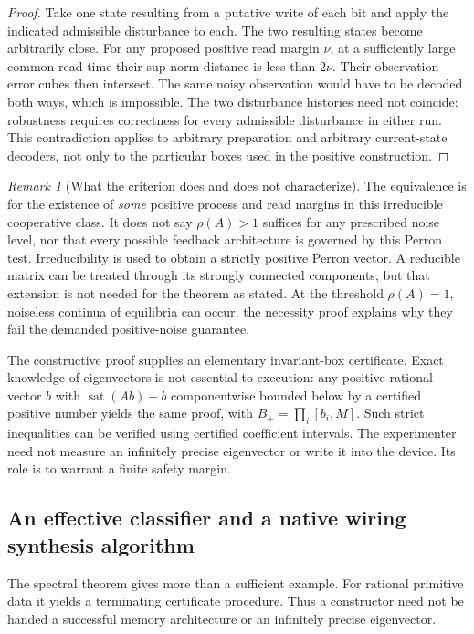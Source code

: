 \documentclass[11pt]{article}
\theoremstyle{definition}
\theoremstyle{remark}
\newtheorem{remark}[theorem]{Remark}
\newcommand{\sat}{\operatorname{sat}}
\begin{document}
\begin{proof}
Take one state resulting from a putative write of each bit and apply the indicated admissible disturbance to each. The two resulting states become arbitrarily close. For any proposed positive read margin $\nu$, at a sufficiently large common read time their sup-norm distance is less than $2\nu$. Their observation-error cubes then intersect. The same noisy observation would have to be decoded both ways, which is impossible. The two disturbance histories need not coincide: robustness requires correctness for every admissible disturbance in either run. This contradiction applies to arbitrary preparation and arbitrary current-state decoders, not only to the particular boxes used in the positive construction.
\end{proof}

\begin{remark}[What the criterion does and does not characterize]
The equivalence is for the existence of \emph{some} positive process and read margins in this irreducible cooperative class. It does not say $\rho(A)>1$ suffices for any prescribed noise level, nor that every possible feedback architecture is governed by this Perron test. Irreducibility is used to obtain a strictly positive Perron vector. A reducible matrix can be treated through its strongly connected components, but that extension is not needed for the theorem as stated. At the threshold $\rho(A)=1$, noiseless continua of equilibria can occur; the necessity proof explains why they fail the demanded positive-noise guarantee.
\end{remark}

The constructive proof supplies an elementary invariant-box certificate. Exact knowledge of eigenvectors is not essential to execution: any positive rational vector $b$ with $\sat(Ab)-b$ componentwise bounded below by a certified positive number yields the same proof, with $B_+=\prod_i[b_i,M]$. Such strict inequalities can be verified using certified coefficient intervals. The experimenter need not measure an infinitely precise eigenvector or write it into the device. Its role is to warrant a finite safety margin.

\subsection{An effective classifier and a native wiring synthesis algorithm}
\label{sec:wiring-synthesis}
The spectral theorem gives more than a sufficient example. For rational
primitive data it yields a terminating certificate procedure. Thus a
constructor need not be handed a successful memory architecture or an
infinitely precise eigenvector.
\end{document}
